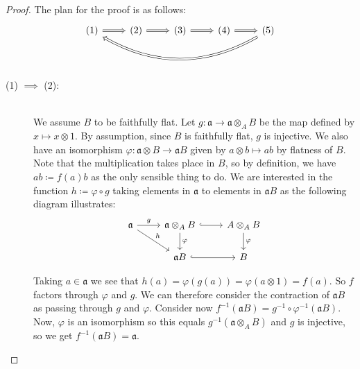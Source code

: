 \documentclass{article}
\newcommand{\tensor}{\otimes}
\renewcommand{\a}{\mathfrak{a}}
\begin{document}
    \begin{proof} The plan for the proof is as follows:
        \begin{equation}
            \notag
            \begin{tikzcd}
                (1) \ar[r, Rightarrow] & (2) \ar[r, Rightarrow] & (3) \ar[r, Rightarrow] & (4) \ar[r, Rightarrow] & (5) \ar[llll, bend left, Rightarrow]\\
            \end{tikzcd}
        \end{equation}

        \begin{description}
            \item[(1) $\implies$ (2):]\hfill \\ We assume $B$ to be faithfully
                flat. Let $g\colon \a \to \a \tensor_A B$ be the map defined by
                $x \mapsto x \tensor 1$.  By assumption, since $B$ is
                faithfully flat, $g$ is injective. We also have an isomorphism
                $\varphi \colon \a \tensor B \to \a B$ given by $a\tensor b
                \mapsto ab$ by flatness of $B$. Note that the multiplication
                takes place in $B$, so by definition, we have $ab \coloneqq
                f(a)b$ as the only sensible thing to do. We are interested in
                the function $h \coloneqq \varphi \circ g$ taking elements in
                $\a$ to elements in $\a B$ as the following diagram
                illustrates:
            \begin{equation}
                \notag
                \begin{tikzcd}
                    \a \ar[r, "g"] \ar[dr, "h"] & \a \tensor_A B \ar[d, "\varphi"] \ar[r, hookrightarrow] & A \tensor_A B \ar[d, "\varphi"]\\
                    & \a B \ar[r, hookrightarrow] & B
                \end{tikzcd}
            \end{equation}

            Taking $a \in \a$ we see that $h(a) = \varphi(g(a)) = \varphi(a
            \tensor 1) = f(a)$. So $f$ factors through $\varphi$ and $g$. We
            can therefore consider the contraction of $\a B$ as passing through
            $g$ and $\varphi$. Consider now $f^{-1}(\a B) = g^{-1}\circ
            \varphi^{-1} (\a B)$. Now, $\varphi$ is an isomorphism so this
            equals $g^{-1}(\a \tensor_A B)$ and $g$ is injective, so we get
            $f^{-1}(\a B) = \a$.
    

\end{description}
\end{proof}
\end{document}

